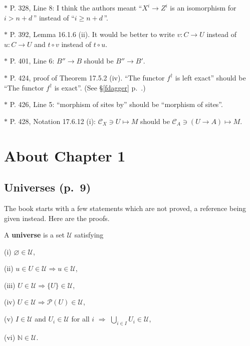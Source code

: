 \documentclass[12pt]{article}
\theoremstyle{remark}
\theoremstyle{definition}
\newtheorem{s}[thm]{\S}
\newcommand{\C}{\mathcal C}
\newcommand{\then}{\Rightarrow}
\DeclareMathOperator*{\co}{colim}
\DeclareMathOperator{\Hom}{Hom}%
\begin{document}
\noindent $*$ P. 328, Line 8: I think the authors meant ``$X^i\to Z^i$ is an isomorphism for $i>n+d\,$'' instead of ``$i\ge n+d\,$''.

\noindent $*$ P. 392, Lemma 16.1.6 (ii). It would be better to write $v:C\to U$ instead of $u:C\to U$ and $t\circ v$ instead of $t\circ u$.

\noindent $*$ P. 401, Line 6: $B''\to B$ should be $B''\to B'$.
%
\begin{comment}
\begin{s}\label{c406}
P. 406. I don't understand the isomorphism 
$$
\left((f^t)\ \widehat{}A\right)(U)\simeq\co_{(V\to A)\in(\C_Y)_A^\wedge}\Hom_{(\C_Y)^\wedge}(f^t(V),U).
$$ 
I would have written 
$$
\left((f^t)\ \widehat{}A\right)(U)\simeq\co_{(V\to A)\in(\C_Y)_A}\Hom_{\C_X}(U,f^t(V)).
$$
\end{s}
\end{comment}
%
\noindent $*$ P. 424, proof of Theorem 17.5.2 (iv). ``The functor $f^\dagger$ is left exact'' should be ``The functor $f^\dagger$ is exact''. (See \S\ref{fdagger} p.~\pageref{fdagger}.) %

\noindent $*$ P. 426, Line 5: ``morphism of sites by'' should be ``morphism of sites''.

\noindent $*$ P. 428, Notation 17.6.12 (i): $\C_X\ni U\mapsto M$ should be $\C_A\ni(U\to A)\mapsto M$.
%
\section{About Chapter 1}
%
%
\subsection{Universes (p.~9)}
%
The book starts with a few statements which are not proved, a reference being given instead. Here are the proofs.

A \textbf{universe} is a set $\mathcal U$ satisfying 

(i) $\varnothing\in\mathcal U$,

(ii) $u\in U\in\mathcal U\then u\in \mathcal U$,

(iii) $U\in\mathcal U\then\{U\}\in\mathcal U$,

(iv) $U\in\mathcal U\then\mathcal P(U)\in\mathcal U$,

(v) $I\in\mathcal U$ and $U_i\in\mathcal U$ for all $i$ $\then$ $\bigcup_{i\in I}U_i\in\mathcal U$,

(vi) $\mathbb N\in\mathcal U$.
\end{document}
